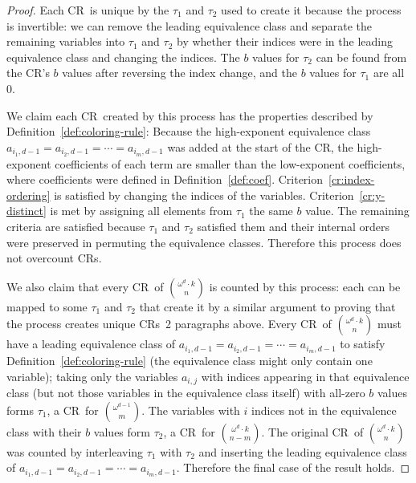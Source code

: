 \documentclass[10pt,a4paper]{article}
\newcommand{\om}{\omega}
\newcommand{\crulenospace}{CR}
\newcommand{\crule}{\crulenospace~}
\newcommand{\crules}{\crulenospace s~}
\newcommand{\crulesnospace}{\crulenospace s}
\newcommand{\numpoints}{n}
\newcommand{\inumpoints}{i}
\newcommand{\idegr}{j}
\newcommand{\commonconst}{a}
\newcommand{\rareconst}{b}
\theoremstyle{plain}
\theoremstyle{definition}
\begin{document}
\begin{proof}
Each \crule is unique by the $\tau_1$ and $\tau_2$ used to create it because the process is invertible: we can remove the leading equivalence class and separate the remaining variables into $\tau_1$ and $\tau_2$ by whether their indices were in the leading equivalence class and changing the indices. The $\rareconst$ values for $\tau_2$ can be found from the \crulenospace's $\rareconst$ values after reversing the index change, and the $\rareconst$ values for $\tau_1$ are all 0.

We claim each \crule created by this process has the properties described by Definition~\ref{def:coloring-rule}: Because the high-exponent equivalence class $\commonconst_{\inumpoints_1,d-1} = \commonconst_{\inumpoints_2,d-1} = \cdots = \commonconst_{\inumpoints_m,d-1}$ was added at the start of the \crulenospace, the high-exponent coefficients of each term are smaller than the low-exponent coefficients, where coefficients
were defined in Definition~\ref{def:coef}. 
Criterion~\ref{cr:index-ordering} is satisfied by changing the indices of the variables. Criterion~\ref{cr:y-distinct} is met by assigning all elements from $\tau_1$ the same $\rareconst$ value.
The remaining criteria are satisfied because $\tau_1$ and $\tau_2$ satisfied them and their internal orders were preserved in permuting the equivalence classes. Therefore this process does not overcount \crulesnospace.

We also claim that every \crule of $\binom{\om^d\cdot k}{\numpoints}$ is counted by this process: each can be mapped to some $\tau_1$ and $\tau_2$ that create it by a similar argument to proving that the process creates unique \crules 2 paragraphs above. Every \crule of $\binom{\om^d\cdot k}{\numpoints}$ must have a leading equivalence class of $\commonconst_{\inumpoints_1,d-1} = \commonconst_{\inumpoints_2,d-1} = \cdots = \commonconst_{\inumpoints_m,d-1}$ to satisfy Definition~\ref{def:coloring-rule} 
(the equivalence class might only contain one variable); taking only the variables $\commonconst_{\inumpoints,\idegr}$ with indices appearing in that equivalence class (but not those variables in the equivalence class itself) with all-zero $\rareconst$ values forms $\tau_1$, a \crule for $\binom{\om^{d-1}}{m}$. The variables with $\inumpoints$ indices not in the equivalence class with their $\rareconst$ values form $\tau_2$, a \crule for $\binom{\om^d\cdot k}{\numpoints-m}$. The original \crule of $\binom{\om^d \cdot k}{\numpoints}$ was counted by interleaving $\tau_1$ with $\tau_2$ and inserting the leading equivalence class of $\commonconst_{\inumpoints_1,d-1} = \commonconst_{\inumpoints_2,d-1} = \cdots = \commonconst_{\inumpoints_m,d-1}$.
Therefore the final case of the result holds.
\end{proof}
\end{document}
